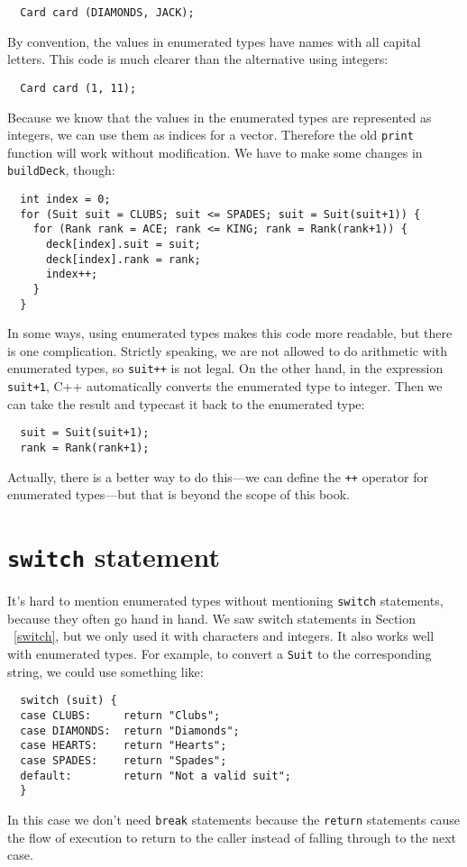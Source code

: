 \begin{verbatim}
  Card card (DIAMONDS, JACK);
\end{verbatim}
%
By convention, the values in enumerated types have names with
all capital letters. 
This code is much clearer than the alternative using integers:

\begin{verbatim}
  Card card (1, 11);
\end{verbatim}
%
Because we know that the values in the enumerated types are
represented as integers, we can use them as indices for a vector.
Therefore the old {\tt print} function will work without
modification.  We have to make some changes in {\tt buildDeck},
though:

\begin{verbatim}
  int index = 0;
  for (Suit suit = CLUBS; suit <= SPADES; suit = Suit(suit+1)) {
    for (Rank rank = ACE; rank <= KING; rank = Rank(rank+1)) {
      deck[index].suit = suit;
      deck[index].rank = rank;
      index++;
    }
  }
\end{verbatim}
%
In some ways, using enumerated types makes this code more readable,
but there is one complication.  Strictly speaking, we are not
allowed to do arithmetic with enumerated types, so {\tt suit++}
is not legal.  On the other hand, in the expression {\tt suit+1},
C++ automatically converts the enumerated type to integer.  Then
we can take the result and typecast it back to the enumerated type:

\begin{verbatim}
  suit = Suit(suit+1);
  rank = Rank(rank+1);
\end{verbatim}
%
Actually, there is a better way to do this---we can define
the {\tt ++} operator for enumerated types---but that is beyond
the scope of this book.

\section{{\tt switch} statement}

It's hard to mention enumerated types without mentioning {\tt switch}
statements, because they often go hand in hand.  We saw switch statements in Section ~\ref{switch}, but we only used it with characters and integers. It also works well with enumerated types.
For example, to convert a {\tt Suit} to the corresponding
string, we could use something like:

\begin{verbatim}
  switch (suit) {
  case CLUBS:     return "Clubs";
  case DIAMONDS:  return "Diamonds";
  case HEARTS:    return "Hearts";
  case SPADES:    return "Spades";
  default:        return "Not a valid suit";
  }
\end{verbatim}
%
In this case we don't need {\tt break} statements because the
{\tt return} statements cause the flow of execution to return to
the caller instead of falling through to the next case.


